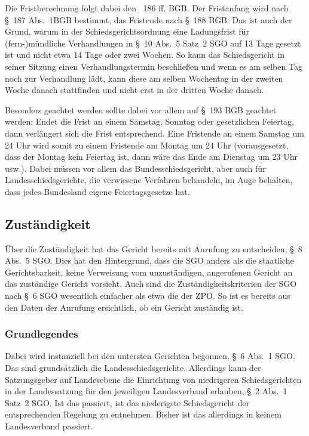 Die Fristberechnung folgt dabei den \SSS~186 ff. BGB.
Der Fristanfang wird nach \S~187 Abs.~1BGB bestimmt, das Fristende nach \S~188 BGB.
Das ist auch der Grund, warum in der Schiedsgerichtsordnung eine Ladungsfrist für (fern-)mündliche Verhandlungen in \S~10 Abs.~5 Satz~2 SGO auf 13 Tage gesetzt ist und nicht etwa 14 Tage oder zwei Wochen.
So kann das Schiedsgericht in seiner Sitzung einen Verhandlungstermin beschließen und wenn es am selben Tag noch zur Verhandlung lädt, kann diese am selben Wochentag in der zweiten Woche danach stattfinden und nicht erst in der dritten Woche danach.

Besonders geachtet werden sollte dabei vor allem auf \S~193 BGB geachtet werden: Endet die Frist an einem Samstag, Sonntag oder gesetzlichen Feiertag, dann verlängert sich die Frist entsprechend.
Eine Fristende an einem Samstag um 24 Uhr wird somit zu einem Fristende am Montag um 24 Uhr (vorausgesetzt, dass der Montag kein Feiertag ist, dann wäre das Ende am Dienstag um 23 Uhr usw.).
Dabei müssen vor allem das Bundesschiedsgericht, aber auch für Landesschiedsgerichte, die verwiesene Verfahren behandeln, im Auge behalten, dass jedes Bundesland eigene Feiertagsgesetze hat.

\subsection{Zuständigkeit}
\label{Standardworkflow:Zustaendigkeit}
Über die Zuständigkeit hat das Gericht bereits mit Anrufung zu entscheiden, \S~8 Abs.~5 SGO.
Dies hat den Hintergrund, dass die SGO anders als die staatliche Gerichtsbarkeit, keine Verweisung vom unzuständigen, angerufenen Gericht an das zuständige Gericht vorsieht.
Auch sind die Zuständigkeitskriterien der SGO nach \S~6 SGO wesentlich einfacher als etwa die der ZPO.
So ist es bereits aus den Daten der Anrufung ersichtlich, ob ein Gericht zuständig ist.

\subsubsection{Grundlegendes}
\label{Standardworkflow:Zustaendigkeit:Grundlegendes}
Dabei wird instanziell bei den untersten Gerichten begonnen, \S~6 Abs.~1 SGO.
Das sind grundsätzlich die Landesschiedsgerichte.
Allerdings kann der Satzungsgeber auf Landesebene die Einrichtung von niedrigeren Schiedsgerichten in der Landessatzung für den jeweiligen Landesverband erlauben, \S~2 Abs.~1 Satz~2 SGO.
Ist das passiert, ist das niederigste Schiedsgericht der entsprechenden Regelung zu entnehmen.
Bisher ist das allerdings in keinem Landesverband passiert.

